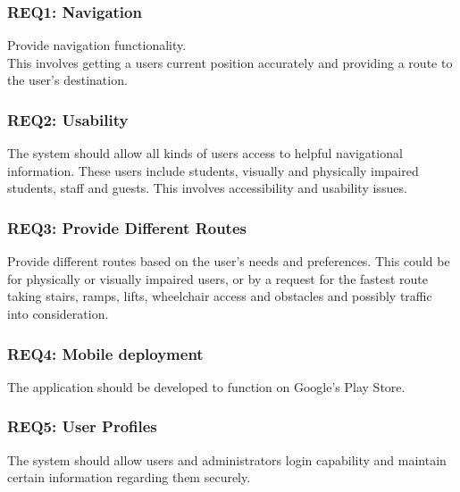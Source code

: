 \documentclass{article}
\begin{document}
		\subsubsection {REQ1: Navigation}
			Provide navigation functionality.\\ This involves getting a users current position accurately and providing a route to the user's destination.
			
		\subsubsection{REQ2: Usability}
			The system should allow all kinds of users access to helpful navigational information. These users include students, visually and physically impaired students, staff and guests. This involves accessibility and usability issues.
			
		\subsubsection{REQ3: Provide Different Routes}
			Provide different routes based on the user's needs and preferences. This could be for physically or visually impaired users, or by a request for the fastest route taking stairs, ramps, lifts, wheelchair access and obstacles and possibly traffic into consideration. %
			
		\subsubsection{REQ4: Mobile deployment}
			The application should be developed to function on Google's Play Store. %
		
		\subsubsection{REQ5: User Profiles}
			The system should allow users and administrators login capability and maintain certain information regarding them securely. %
			
\end{document}
